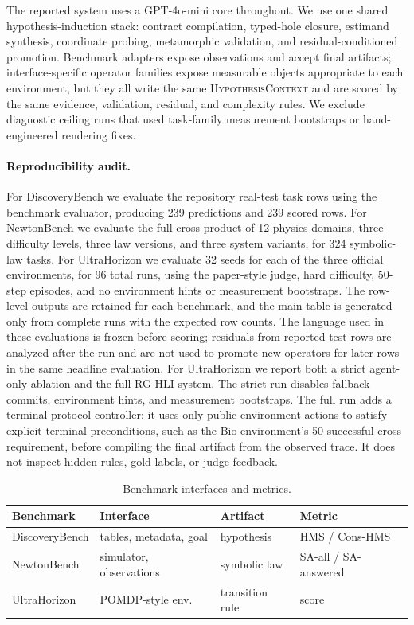 \documentclass[letterpaper]{article}
\newcommand{\tblhdr}{\rowcolor{headerrow}}
\newcommand{\methodshort}{\textsc{RG-HLI}\xspace}
\newcommand{\gptmini}{GPT-4o-mini\xspace}
\begin{document}
The reported system uses a \gptmini core throughout. We use one shared
hypothesis-induction stack: contract compilation, typed-hole closure,
estimand synthesis, coordinate probing, metamorphic validation, and
residual-conditioned promotion. Benchmark adapters expose observations and
accept final artifacts; interface-specific operator families expose measurable
objects appropriate to each environment, but they all write the same
\textsc{HypothesisContext} and are scored by the same evidence, validation,
residual, and complexity rules. We exclude diagnostic ceiling runs that used
task-family measurement bootstraps or hand-engineered rendering fixes.

\paragraph{Reproducibility audit.}
For DiscoveryBench we evaluate the repository real-test task rows using the
benchmark evaluator, producing 239 predictions and 239 scored rows. For
NewtonBench we evaluate the full cross-product of 12 physics domains, three
difficulty levels, three law versions, and three system variants, for 324
symbolic-law tasks. For UltraHorizon we evaluate 32 seeds for each of the
three official environments, for 96 total runs, using the paper-style judge,
hard difficulty, 50-step episodes, and no environment hints or measurement
bootstraps. The row-level outputs are retained for each benchmark, and the main
table is generated only from complete runs with the expected row counts. The
language used in these evaluations is frozen before scoring; residuals from
reported test rows are analyzed after the run and are not used to promote new
operators for later rows in the same headline evaluation.
For UltraHorizon we report both a strict agent-only ablation and the full
\methodshort system. The strict run disables fallback commits, environment
hints, and measurement bootstraps. The full run adds a terminal protocol
controller: it uses only public environment actions to satisfy explicit
terminal preconditions, such as the Bio environment's 50-successful-cross
requirement, before compiling the final artifact from the observed trace. It
does not inspect hidden rules, gold labels, or judge feedback.

\begin{table}[!htbp]
\centering
\caption{Benchmark interfaces and metrics.}
\label{tab:benchmarks}
\small
\setlength{\tabcolsep}{4pt}
\begin{tabularx}{\columnwidth}{@{}lYYY@{}}
\toprule
\tblhdr
Benchmark & Interface & Artifact & Metric \\
\midrule
DiscoveryBench & tables, metadata, goal & hypothesis & HMS / Cons-HMS \\
NewtonBench & simulator, observations & symbolic law & SA-all / SA-answered \\
UltraHorizon & POMDP-style env. & transition rule & score \\
\bottomrule
\end{tabularx}
\end{table}
\end{document}
